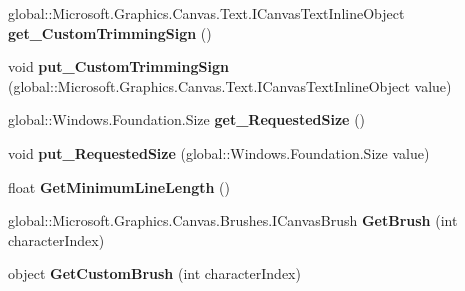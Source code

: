 \begin{DoxyCompactItemize}
global\+::\+Microsoft.\+Graphics.\+Canvas.\+Text.\+I\+Canvas\+Text\+Inline\+Object {\bfseries get\+\_\+\+Custom\+Trimming\+Sign} ()
\item 
\mbox{\label{interface_microsoft_1_1_graphics_1_1_canvas_1_1_text_1_1_i_canvas_text_layout_ad0963a1a76ce3a3b271681e1b918507a}} 
void {\bfseries put\+\_\+\+Custom\+Trimming\+Sign} (global\+::\+Microsoft.\+Graphics.\+Canvas.\+Text.\+I\+Canvas\+Text\+Inline\+Object value)
\item 
\mbox{\label{interface_microsoft_1_1_graphics_1_1_canvas_1_1_text_1_1_i_canvas_text_layout_a1841b5e910690e9cee09e1ac213a8ac1}} 
global\+::\+Windows.\+Foundation.\+Size {\bfseries get\+\_\+\+Requested\+Size} ()
\item 
\mbox{\label{interface_microsoft_1_1_graphics_1_1_canvas_1_1_text_1_1_i_canvas_text_layout_ab9dab05e946a16f3890a64994cacbefa}} 
void {\bfseries put\+\_\+\+Requested\+Size} (global\+::\+Windows.\+Foundation.\+Size value)
\item 
\mbox{\label{interface_microsoft_1_1_graphics_1_1_canvas_1_1_text_1_1_i_canvas_text_layout_ab72d6c0b05ffd6c77a1ea9209068762f}} 
float {\bfseries Get\+Minimum\+Line\+Length} ()
\item 
\mbox{\label{interface_microsoft_1_1_graphics_1_1_canvas_1_1_text_1_1_i_canvas_text_layout_ad050d500e747c564fb32606eae5ef1dd}} 
global\+::\+Microsoft.\+Graphics.\+Canvas.\+Brushes.\+I\+Canvas\+Brush {\bfseries Get\+Brush} (int character\+Index)
\item 
\mbox{\label{interface_microsoft_1_1_graphics_1_1_canvas_1_1_text_1_1_i_canvas_text_layout_a7a95a3c170985bc5b49dca2fa202e6f0}} 
object {\bfseries Get\+Custom\+Brush} (int character\+Index)
\item 
\mbox{\label{interface_microsoft_1_1_graphics_1_1_canvas_1_1_text_1_1_i_canvas_text_layout_ae740709ccfaa0a5c4435926659d785bd}} 

\end{DoxyCompactItemize}
